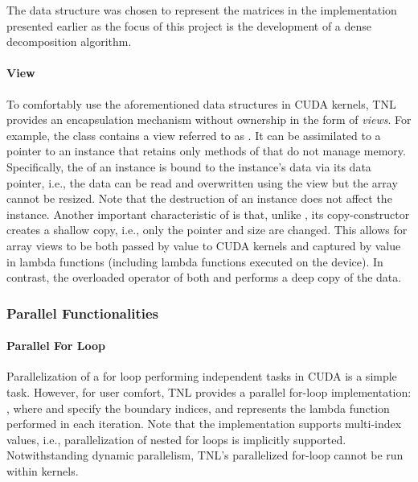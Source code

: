 The  data structure was chosen to represent the matrices in the implementation presented earlier as the focus of this project is the development of a dense decomposition algorithm.

\paragraph{View} To comfortably use the aforementioned data structures in CUDA kernels, TNL provides an encapsulation mechanism without ownership in the form of \textit{views}.
For example, the  class contains a view referred to as .
It can be assimilated to a pointer to an  instance that retains only methods of  that do not manage memory.
Specifically, the  of an  instance is bound to the  instance's data via its data pointer, i.e., the data can be read and overwritten using the view but the array cannot be resized.
Note that the destruction of an  instance does not affect the  instance.
Another important characteristic of  is that, unlike , its copy-constructor creates a shallow copy, i.e., only the pointer and size are changed.
This allows for array views to be both passed by value to CUDA kernels and captured by value in lambda functions (including lambda functions executed on the device).
In contrast, the overloaded operator  of both  and  performs a deep copy of the data.

\subsubsection{Parallel Functionalities}\label{Subsection:implementation->libraries-used->TNL->parallel-functionalities}

\paragraph{Parallel For Loop} Parallelization of a for loop performing independent tasks in CUDA is a simple task.
However, for user comfort, TNL provides a parallel for-loop implementation: , where  and  specify the boundary indices, and  represents the lambda function performed in each iteration.
Note that the implementation supports multi-index values, i.e., parallelization of nested for loops is implicitly supported.
Notwithstanding dynamic parallelism, TNL's parallelized for-loop cannot be run within kernels.

